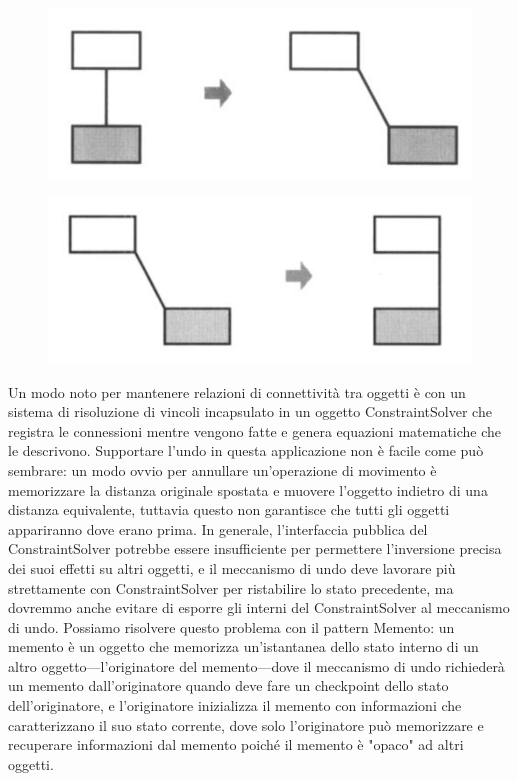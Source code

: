\begin{multicols}{2}
    \begin{figure}[H]
        \centering
        \includegraphics[width=1\linewidth]{assets/pattern/memento/memento-esempio-1.png}
    \end{figure}
    \columnbreak
    \vline
    \begin{figure}[H]
        \centering
        \includegraphics[width=1\linewidth]{assets/pattern/memento/memento-esempio-2.png}
    \end{figure}
\end{multicols}

Un modo noto per mantenere relazioni di connettività tra oggetti è con un sistema di risoluzione di vincoli incapsulato in un oggetto ConstraintSolver che registra le connessioni mentre vengono fatte e genera equazioni matematiche che le descrivono. Supportare l'undo in questa applicazione non è facile come può sembrare: un modo ovvio per annullare un'operazione di movimento è memorizzare la distanza originale spostata e muovere l'oggetto indietro di una distanza equivalente, tuttavia questo non garantisce che tutti gli oggetti appariranno dove erano prima. In generale, l'interfaccia pubblica del ConstraintSolver potrebbe essere insufficiente per permettere l'inversione precisa dei suoi effetti su altri oggetti, e il meccanismo di undo deve lavorare più strettamente con ConstraintSolver per ristabilire lo stato precedente, ma dovremmo anche evitare di esporre gli interni del ConstraintSolver al meccanismo di undo. Possiamo risolvere questo problema con il pattern Memento: un memento è un oggetto che memorizza un'istantanea dello stato interno di un altro oggetto—l'originatore del memento—dove il meccanismo di undo richiederà un memento dall'originatore quando deve fare un checkpoint dello stato dell'originatore, e l'originatore inizializza il memento con informazioni che caratterizzano il suo stato corrente, dove solo l'originatore può memorizzare e recuperare informazioni dal memento poiché il memento è "opaco" ad altri oggetti.

